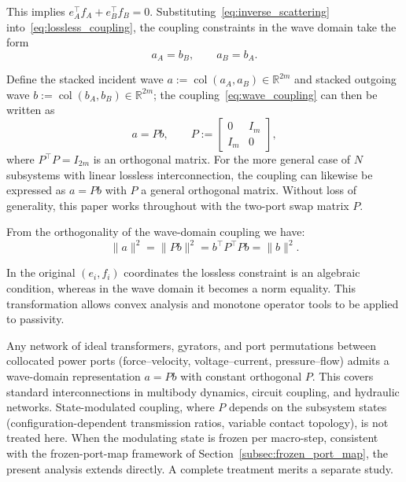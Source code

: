 This implies $e_A^\top f_A + e_B^\top f_B = 0$. Substituting~\eqref{eq:inverse_scattering} into~\eqref{eq:lossless_coupling}, the coupling constraints in the wave domain take the form
\begin{equation}
a_A = b_B, \qquad a_B = b_A.
\label{eq:wave_coupling}
\end{equation}

Define the stacked incident wave $a := \operatorname{col}(a_A, a_B) \in \mathbb{R}^{2m}$ and stacked outgoing wave $b := \operatorname{col}(b_A, b_B) \in \mathbb{R}^{2m}$; the coupling~\eqref{eq:wave_coupling} can then be written as
\begin{equation}
a = P b, \qquad P := \begin{bmatrix} 0 & I_m \\ I_m & 0 \end{bmatrix},
\label{eq:coupling_matrix}
\end{equation}
where $P^\top P = I_{2m}$ is an orthogonal matrix. For the more general case of $N$ subsystems with linear lossless interconnection, the coupling can likewise be expressed as $a = P b$ with $P$ a general orthogonal matrix. Without loss of generality, this paper works throughout with the two-port swap matrix $P$.

From the orthogonality of the wave-domain coupling we have:
\begin{equation}
\|a\|^2 = \|P b\|^2 = b^\top P^\top P b = \|b\|^2.
\label{eq:coupling_norm}
\end{equation}

In the original $(e_i, f_i)$ coordinates the lossless constraint is an algebraic condition, whereas in the wave domain it becomes a norm equality. This transformation allows convex analysis and monotone operator tools to be applied to passivity.

\begin{remark}
\label{rem:linear_coupling_scope}
Any network of ideal transformers, gyrators, and port permutations between collocated power ports (force--velocity, voltage--current, pressure--flow) admits a wave-domain representation $a = Pb$ with constant orthogonal $P$. This covers standard interconnections in multibody dynamics, circuit coupling, and hydraulic networks. State-modulated coupling, where $P$ depends on the subsystem states (configuration-dependent transmission ratios, variable contact topology), is not treated here. When the modulating state is frozen per macro-step, consistent with the frozen-port-map framework of Section~\ref{subsec:frozen_port_map}, the present analysis extends directly. A complete treatment merits a separate study.
\end{remark}

